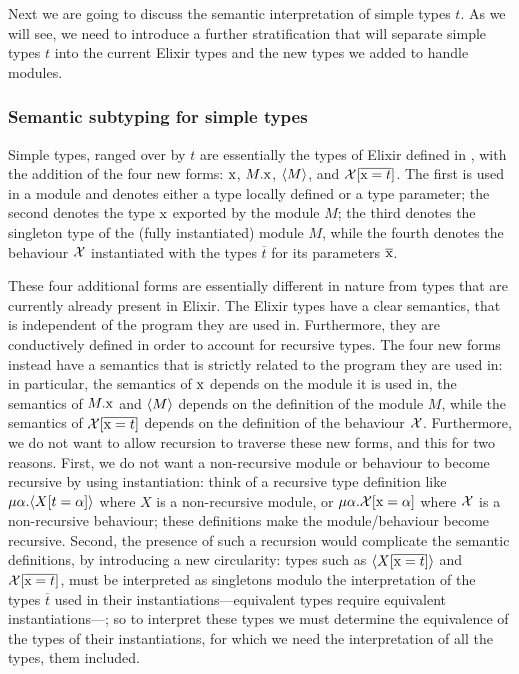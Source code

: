 \documentclass[a4paper,10pt]{article}
\begin{document}
Next we are going to discuss the semantic interpretation of simple types $t$. As we will see, we need to introduce a further stratification that will separate simple types $t$ into the current Elixir types and the new types we added to handle modules.



\subsubsection{Semantic subtyping for simple types}
Simple types, ranged over by $t$ are essentially the types of Elixir defined in \cite{CDV24,CD25}, with the addition of the four new forms: $\text{\rm x}$, $M.\text{\rm x}$, $\langle M\rangle$, and $\mathcal{X}[\overline{\text{\rm x}=t}]$. The first is used in a module and denotes either a type locally defined or a type parameter; the second denotes  the type $\text{\rm x}$ exported by the module $M$; the third denotes the singleton type of the (fully instantiated) module $M$, while the fourth denotes the behaviour $\mathcal{X}$ instantiated with the types $\overline{t}$ for its parameters $\overline{\text{\rm x}}$.

These four additional forms are essentially different in nature from types that are currently already present in Elixir. The Elixir types have a clear semantics, that is independent of the program they are used in. Furthermore, they are conductively defined in order to account for recursive types. The four new forms instead have a semantics that is strictly related to the program they are used in: in particular, the semantics of $\text{\rm x}$ depends on the module it is used in, the semantics of $M.\text{\rm x}$ and $\langle M\rangle$ depends on the definition of the module $M$, while the semantics of $\mathcal{X}[\overline{\text{\rm x}=t}]$ depends on the definition of the behaviour $\mathcal{X}$. Furthermore, we do not want to allow recursion to traverse these new forms, and this for two reasons. First, we do not want a non-recursive module or behaviour to become recursive by using instantiation: think of a recursive  type definition like $\mu \alpha .\langle X[t=\alpha]\rangle$ where $X$ is a non-recursive module, or $\mu \alpha .\mathcal{X}[\text{\rm x}=\alpha]$ where $\mathcal{X}$ is a non-recursive behaviour; these definitions make the module/behaviour become recursive. Second, the presence of such a recursion would complicate the semantic definitions, by introducing a new circularity: types such as $\langle X[\overline{\text{\rm x}=t}]\rangle$ and $\mathcal{X}[\overline{\text{\rm x}=t}]$, must be interpreted as singletons modulo the interpretation  of the types $\overline t$ used in their instantiations---equivalent types require equivalent instantiations---; so to interpret these types we must determine the equivalence of the types of their instantiations, for which we need the interpretation of all the types, them included.
\end{document}
